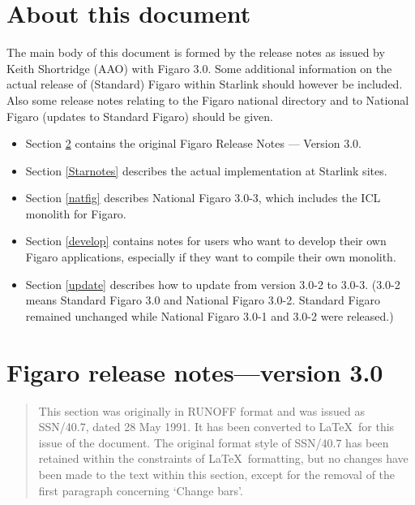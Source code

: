 \newpage
\section{About this document}

The main body of this document is formed by the release notes as
issued by Keith Shortridge (AAO) with Figaro 3.0. Some additional
information on the actual release of (Standard) Figaro within Starlink
should however be included. Also some release notes relating to the
Figaro national directory and to National Figaro (updates to Standard
Figaro) should be given.

\begin{itemize}

\item Section \ref{AAOnotes} contains the original Figaro Release Notes ---
Version 3.0.

\item Section \ref{Starnotes} describes the actual implementation at Starlink
sites.

\item Section \ref{natfig} describes National Figaro 3.0-3, which includes the
ICL monolith for Figaro.

\item Section \ref{develop} contains notes for users who want to develop their
own Figaro applications, especially if they want to compile their own monolith.

\item Section \ref{update} describes how to update from version 3.0-2 to 3.0-3.
(3.0-2 means Standard Figaro 3.0 and National Figaro 3.0-2. Standard Figaro
remained unchanged while National Figaro 3.0-1 and 3.0-2 were released.)

\end{itemize}

\section{Figaro release notes---version 3.0}
\label{AAOnotes}

\begin{quote}\em

This section was originally in RUNOFF format and was issued as SSN/40.7,  dated
28 May 1991. It has been converted to \LaTeX\ for this issue of the document.
The original format style of SSN/40.7 has been retained within the constraints
of \LaTeX\ formatting, but no changes have been made to the text within this
section, except for the removal of the first paragraph concerning `Change
bars'.

\end{quote}

